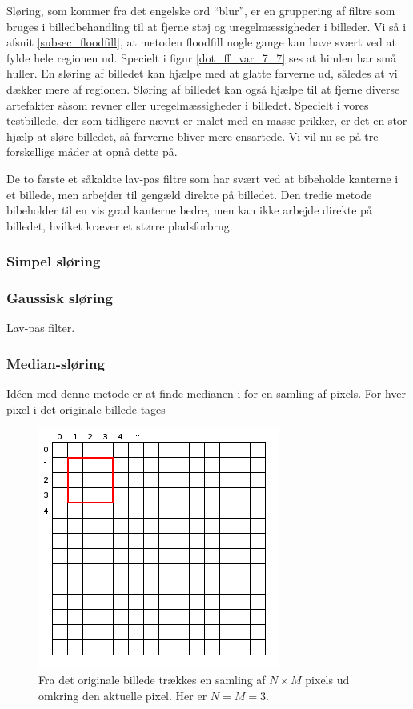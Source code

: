 {
Sløring, som kommer fra det engelske ord ``blur'', er en gruppering af filtre
som bruges i billedbehandling til at fjerne støj og uregelmæssigheder i
billeder. Vi så i afsnit \ref{subsec_floodfill}, at metoden floodfill
nogle gange kan have svært ved at fylde hele regionen ud. Specielt i
figur \ref{dot_ff_var_7_7} ses at himlen har små huller. En sløring af
billedet kan hjælpe med at glatte farverne ud, således at vi dækker mere
af regionen. Sløring af billedet kan også hjælpe til at fjerne diverse
artefakter såsom revner eller uregelmæssigheder i billedet. Specielt i
vores testbillede, der som tidligere nævnt er malet med en masse
prikker, er det en stor hjælp at sløre billedet, så farverne bliver mere
ensartede. Vi vil nu se på tre forskellige måder at opnå dette på.

De to første et såkaldte lav-pas filtre som har svært ved at bibeholde
kanterne i et billede, men arbejder til gengæld direkte på billedet. Den
tredie metode bibeholder til en vis grad kanterne bedre, men kan ikke
arbejde direkte på billedet, hvilket kræver et større pladsforbrug.

\subsubsection*{Simpel sløring}

\subsubsection*{Gaussisk sløring}
Lav-pas filter.

\subsubsection*{Median-sløring}
Idéen med denne metode er at finde medianen i for en samling af pixels.
For hver pixel i det originale billede tages

\begin{figure}[!h]
    \begin{center}
        \includegraphics[scale=0.42,angle=0]{afsnit/vores_implementation/billeder/sloering/red_pixel_box}
    \end{center}
    \caption[]{Fra det originale billede trækkes en samling af
    $N\times{M}$ pixels ud omkring den aktuelle pixel. Her er $N = M =
    3$.}
    \label{red_box_nxm}
\end{figure}

}
